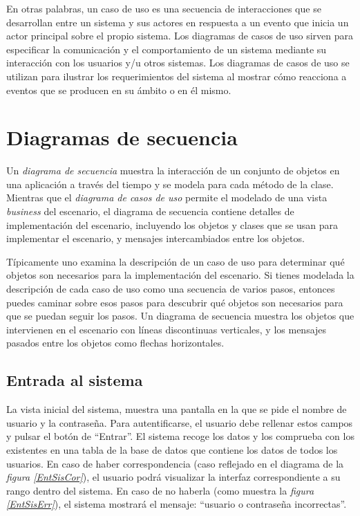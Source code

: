 \documentclass[11pt,a4paper,spanish,twoside]{book}
\begin{document}
En otras palabras, un caso de uso es una secuencia de interacciones que se
desarrollan entre un sistema y sus actores en respuesta a un evento que
inicia un actor principal sobre el propio sistema. Los diagramas de casos de
uso sirven para especificar la comunicación y el comportamiento de un sistema
mediante su interacción con los usuarios y/u otros sistemas. Los diagramas de
casos de uso se utilizan para ilustrar los requerimientos del sistema al
mostrar cómo reacciona a eventos que se producen en su ámbito o en él mismo.

\section{Diagramas de secuencia}
Un \emph{diagrama de secuencia} muestra la interacción de un conjunto de
objetos en una aplicación a través del tiempo y se modela para cada método de
la clase. Mientras que el \emph{diagrama de casos de uso} permite el modelado
de una vista \emph{business} del escenario, el diagrama de secuencia contiene
detalles de implementación del escenario, incluyendo los objetos y clases que
se usan para implementar el escenario, y mensajes intercambiados entre los
objetos.

Típicamente uno examina la descripción de un caso de uso para determinar qué
objetos son necesarios para la implementación del escenario. Si tienes
modelada la descripción de cada caso de uso como una secuencia de varios
pasos, entonces puedes caminar sobre esos pasos para descubrir qué objetos
son necesarios para que se puedan seguir los pasos. Un diagrama de secuencia
muestra los objetos que intervienen en el escenario con líneas discontinuas
verticales, y los mensajes pasados entre los objetos como flechas horizontales.

\subsection{Entrada al sistema}
La vista inicial del sistema, muestra una pantalla en la que se pide el nombre
de usuario y la contraseña. Para autentificarse, el usuario debe rellenar
estos campos y pulsar el botón de ``Entrar''. El sistema recoge los datos y los
comprueba con los existentes en una tabla de la base de datos que contiene los
datos de todos los usuarios. En caso de haber correspondencia (caso reflejado
en el diagrama de la \emph{figura \ref{EntSisCor}}), el usuario podrá
visualizar la interfaz correspondiente a su rango dentro del sistema. En caso
de no haberla (como muestra la \emph{figura \ref{EntSisErr}}), el sistema 
mostrará el mensaje: ``usuario o contraseña incorrectas''.
\end{document}

